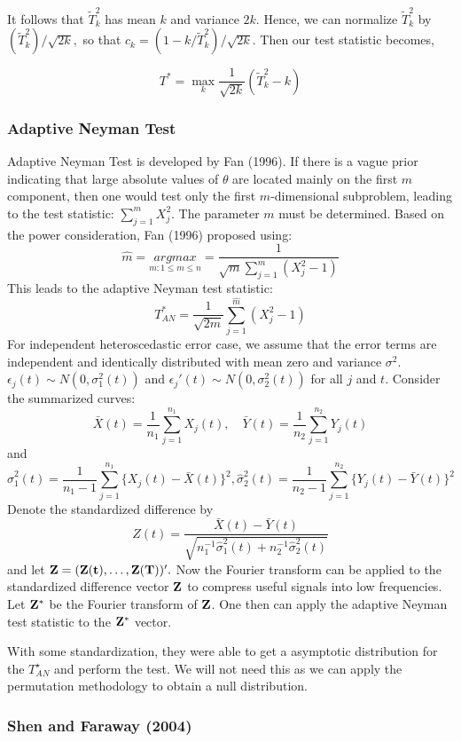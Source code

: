 \documentclass[12pt]{article}
\begin{document}
 It follows that $\tilde{T}_k^2$ has mean $k$ and variance $2k$.
 Hence, we can normalize $\tilde{T}_k^2$ by $ (\tilde{T}_k^2 )/\sqrt{2k},$
 so that $c_k = (1 - k/ \tilde{T}_k^2)/\sqrt{2k}.$
 Then our test statistic becomes,

    \[T^* = \underset{k}{\max} \frac{1}{\sqrt{2k}} (\tilde{T}_k^2 -k)\]

    \subsubsection{Adaptive Neyman Test}
  Adaptive Neyman Test is developed by Fan (1996). If there is a vague prior indicating that
  large absolute values of $\theta$ are located mainly on the first $m$ component, then
  one would test only the first $m$-dimensional subproblem, leading to the test statistic:
  $\sum_{j=1}^{m}X_j^2$. The parameter $m$ must be determined. Based on the power consideration, Fan (1996) proposed using:
\[\hat{m} = \underset{m: 1 \le m \le n}{argmax}=\frac{1}{\sqrt{m}\sum_{j=1}^{m} (X_j^2 - 1)}\]
  This leads to the adaptive Neyman test statistic:
\[T_{AN}^* = \frac{1}{\sqrt{2m}} \sum_{j=1}^{\hat{m}} (X_j^2 - 1) \]
For independent heteroscedastic error case, we assume that the error terms are independent and identically distributed
 with mean zero and variance $\sigma^2.$ $\epsilon_j(t) \sim N(0, \sigma_1^2 (t))$
 and $\epsilon_j'(t) \sim N(0, \sigma_2^2(t))$ for all $j$ and $t.$ Consider the summarized curves:
\[\bar{X}(t) = \frac{1}{n_1} \sum_{j=1}^{n_1} X_j(t),\quad \bar{Y}(t) = \frac{1}{n_2} \sum_{j=1}^{n_2} Y_j(t)\]
    and
\[\hat{\sigma}_1^2(t) = \frac{1}{n_1-1} \sum_{j=1}^{n_1} \{X_j(t) - \bar{X}(t)\}^2,
     \hat{\sigma}_2^2(t) = \frac{1}{n_2-1} \sum_{j=1}^{n_2} \{Y_j(t) - \bar{Y}(t)\}^2 \]
Denote the standardized difference by
\[Z(t) = \frac{\bar{X}(t) - \bar{Y}(t)} {\sqrt{n_1^{-1}\hat{\sigma}_1^2(t) + n_2^{-1}\hat{\sigma}_2^2(t)}}\]
and let $ \bf{Z} = (Z(t), \dots , Z(T))'.$ Now the Fourier transform can be applied to the standardized
 difference vector $\bf{Z}$ to compress useful signals into low frequencies.
 Let $\bf{Z}^* $ be the Fourier transform of $\bf{Z}$. One then can apply the adaptive
 Neyman test statistic to the $\bf{Z}^* $ vector.

    With some standardization, they were able to get a asymptotic distribution for the
     $T_{AN}^{\star}$ and perform the test. We will not need this as we can apply
     the permutation methodology to obtain a null distribution.

    \subsubsection{Shen and Faraway (2004)}
\end{document}
